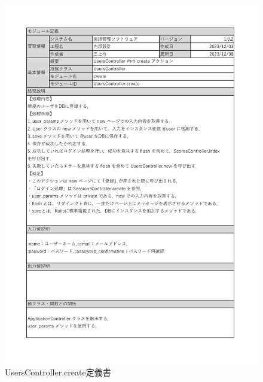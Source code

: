 \begin{figure}
    \centering
    \includegraphics[scale=0.7]{img/Users/xlsx/UsersController_create.pdf}
    \caption{UsersController.create定義書}
\end{figure}
